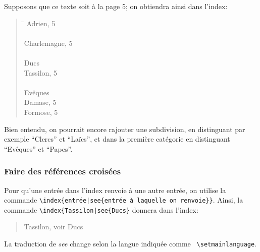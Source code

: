 Supposons que ce texte soit à la page 5; on obtiendra ainsi dans l'index:
\begin{quotation}
\begin{tabbing}
\hspace{0,5cm}  \= \kill
Adrien, 5 \\
\\
Charlemagne, 5 \\
\\
Ducs \\
\> Tassilon, 5\\
\\
Evêques \\
\> Damase, 5\\
\> Formose, 5\\

\end{tabbing}
\end{quotation}



Bien entendu, on pourrait encore rajouter une subdivision, en distinguant par exemple \enquote{Clercs} et \enquote{Laïcs}, et dans la première catégorie en distinguant \enquote{Evêques} et \enquote{Papes}. 

 
\subsubsection{Faire des références croisées}

Pour qu'une entrée dans l'index renvoie à une autre entrée, on utilise la commande  \verb+\index{entrée|see{entrée à laquelle on renvoie}}+. Ainsi, la commande \verb+\index{Tassilon|see{Ducs}+ donnera dans l'index:

\begin{quotation}
Tassilon, voir Ducs
\end{quotation}
La traduction de \emph{see} change selon la langue indiquée comme \verb+ \setmainlanguage+. 



